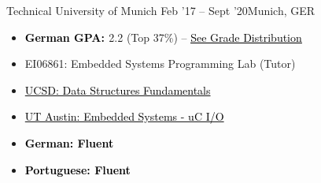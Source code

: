 \documentclass[10pt,a4paper,ragged2e,withhyper]{altacv}
\begin{document}
\begin{paracol}{2}
        {Technical University of Munich}
        {Feb '17 -- Sept '20}{Munich, GER}
\begin{itemize}
\item \textbf{\textcolor{black}{German GPA: }} 2.2 (Top 37\%) -- \href{https://drive.google.com/file/d/1Xesfn8HF9g4oplwqPZMhcFvGFLuyVzIM/view?usp=sharing}{{\textcolor{black}{\underline{See Grade Distribution}}}}
\item EI06861: Embedded Systems Programming Lab (Tutor)
\end{itemize}

\begin{center}
\begin{minipage}[t]{0.40\textwidth}
\begin{itemize}
    \item \href{https://courses.edx.org/certificates/f9250573933e4a3e87e8b28ea989bf99}{{\textcolor{black}{UCSD: Data Structures Fundamentals}}}
    \item \href{https://courses.edx.org/certificates/af6115bce0c646aa95f6aaa6c98acb09}{{\textcolor{black}{UT Austin: Embedded Systems - uC I/O}}}
\end{itemize}
\end{minipage}
\hfill
\begin{minipage}[t]{0.25\textwidth}
\begin{itemize}
    \item \textbf{\textcolor{black}{German: Fluent}}
    \item  \textbf{\textcolor{black}{Portuguese: Fluent}}
\end{itemize}
\end{minipage}
\end{center}



\end{paracol}
\end{document}

